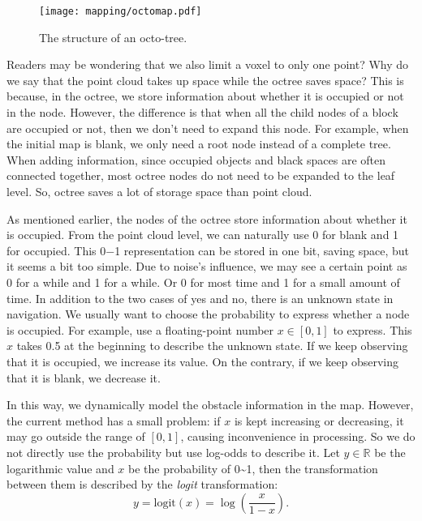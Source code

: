 \begin{figure}[!ht]
	\centering
	\texttt{[image: mapping/octomap.pdf]}
	\caption{The structure of an octo-tree.}
	\label{fig:octomap}
\end{figure}

Readers may be wondering that we also limit a voxel to only one point? Why do we say that the point cloud takes up space while the octree saves space? This is because, in the octree, we store information about whether it is occupied or not in the node. However, the difference is that when all the child nodes of a block are occupied or not, then we don't need to expand this node. For example, when the initial map is blank, we only need a root node instead of a complete tree. When adding information, since occupied objects and black spaces are often connected together, most octree nodes do not need to be expanded to the leaf level. So, octree saves a lot of storage space than point cloud.

As mentioned earlier, the nodes of the octree store information about whether it is occupied. From the point cloud level, we can naturally use 0 for blank and 1 for occupied. This 0−1 representation can be stored in one bit, saving space, but it seems a bit too simple. Due to noise's influence, we may see a certain point as 0 for a while and 1 for a while. Or 0 for most time and 1 for a small amount of time. In addition to the two cases of yes and no, there is an unknown state in navigation. We usually want to choose the probability to express whether a node is occupied. For example, use a floating-point number $x \in [0,1]$ to express. This $x$ takes 0.5 at the beginning to describe the unknown state. If we keep observing that it is occupied, we increase its value. On the contrary, if we keep observing that it is blank, we decrease it.

In this way, we dynamically model the obstacle information in the map. However, the current method has a small problem: if $x$ is kept increasing or decreasing, it may go outside the range of $[0,1]$, causing inconvenience in processing. So we do not directly use the probability but use log-odds to describe it. Let $y \in \mathbb{R}$ be the logarithmic value and $x$ be the probability of 0\textasciitilde1, then the transformation between them is described by the \textit{logit} transformation:
\begin{equation}
y = \mathrm{logit}(x) = \log \left( \frac{x}{1-x} \right).
\end{equation}

